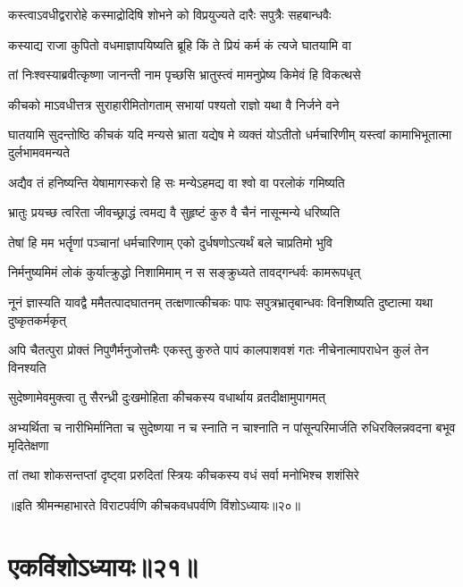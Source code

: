 \twolineshloka
{कस्त्वाऽवधीद्वरारोहे कस्माद्रोदिषि शोभने}
{को विप्रयुज्यते दारैः सपुत्रैः सहबान्धवैः}


\twolineshloka
{कस्याद्य राजा कुपितो वधमाज्ञापयिष्यति}
{ब्रूहि किं ते प्रियं कर्म कं त्यजे घातयामि वा}



\twolineshloka
{तां निःश्वस्याब्रवीत्कृष्णा जानन्ती नाम पृच्छसि}
{भ्रातुस्त्वं मामनुप्रेष्य किमेवं हि विकत्थसे}


\twolineshloka
{कीचको माऽवधीत्तत्र सुराहारीमितोगताम्}
{सभायां पश्यतो राज्ञो यथा वै निर्जने वने}




\threelineshloka
{घातयामि सुदन्तोष्ठि कीचकं यदि मन्यसे}
{भ्राता यद्येष मे व्यक्तं योऽतीतो धर्मचारिणीम्}
{यस्त्वां कामाभिभूतात्मा दुर्लभामवमन्यते}



\twolineshloka
{अद्यैव तं हनिष्यन्ति येषामागस्करो हि सः}
{मन्येऽहमद्य वा श्वो वा परलोकं गमिष्यति}


\twolineshloka
{भ्रातुः प्रयच्छ त्वरिता जीवच्छ्राद्धं त्वमद्य वै}
{सुहृष्टं कुरु वै चैनं नासून्मन्ये धरिष्यति}


\twolineshloka
{तेषां हि मम भर्तॄणां पञ्चानां धर्मचारिणाम्}
{एको दुर्धषणोऽत्यर्थं बले चाप्रतिमो भुवि}


\twolineshloka
{निर्मनुष्यमिमं लोकं कुर्यात्क्रुद्धो निशामिमाम्}
{न स सङ्क्रुध्यते तावद्गन्धर्वः कामरूपधृत्}


\threelineshloka
{नूनं ज्ञास्यति यावद्वै ममैतत्पादघातनम्}
{तत्क्षणात्कीचकः पापः सपुत्रभ्रातृबान्धवः}
{विनशिष्यति दुष्टात्मा यथा दुष्कृतकर्मकृत्}


\threelineshloka
{अपि चैतत्पुरा प्रोक्तं निपुणैर्मनुजोत्तमैः}
{एकस्तु कुरुते पापं कालपाशवशं गतः}
{नीचेनात्मापराधेन कुलं तेन विनश्यति}



\twolineshloka
{सुदेष्णामेवमुक्त्वा तु सैरन्ध्री दुःखमोहिता}
{कीचकस्य वधार्थाय व्रतदीक्षामुपागमत्}


\threelineshloka
{अभ्यर्थिता च नारीभिर्मानिता च सुदेष्णया}
{न च स्नाति न चाश्नाति न पांसून्परिमार्जति}
{रुधिरक्लिन्नवदना बभूव मृदितेक्षणा}


\twolineshloka
{तां तथा शोकसन्तप्तां दृष्ट्वा प्ररुदितां स्त्रियः}
{कीचकस्य वधं सर्वा मनोभिश्च शशंसिरे}

॥इति श्रीमन्महाभारते विराटपर्वणि कीचकवधपर्वणि विंशोऽध्यायः॥२०॥

\chapter{एकविंशोऽध्यायः॥२१॥}


